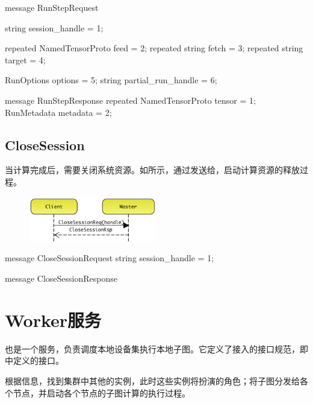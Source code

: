 \begin{content}
\begin{content}
\begin{leftbar}
\begin{c++}
message RunStepRequest {
  string session_handle = 1;

  repeated NamedTensorProto feed = 2;
  repeated string fetch = 3;
  repeated string target = 4;

  RunOptions options = 5;
  string partial_run_handle = 6;
}

message RunStepResponse {
  repeated NamedTensorProto tensor = 1;
  RunMetadata metadata = 2;
}
\end{c++}
\end{leftbar}

\subsection{CloseSession}

当计算完成后，需要关闭系统资源。如所示，通过发送给，启动计算资源的释放过程。

\begin{figure}[H]
\centering
\includegraphics[width=0.5\textwidth]{figures/dist-ms-closs-sess.png}
\caption{}
 \label{fig:dist-ms-closs-sess}
\end{figure}

\begin{leftbar}
\begin{c++}
message CloseSessionRequest {
  string session_handle = 1;
}

message CloseSessionResponse {
}
\end{c++}
\end{leftbar}

\section{Worker服务}

\begin{content}

也是一个服务，负责调度本地设备集执行本地子图。它定义了接入的接口规范，即中定义的接口。

根据信息，找到集群中其他的实例，此时这些实例将扮演的角色；将子图分发给各个节点，并启动各个节点的子图计算的执行过程。


\end{content}
\end{content}
\end{content}
